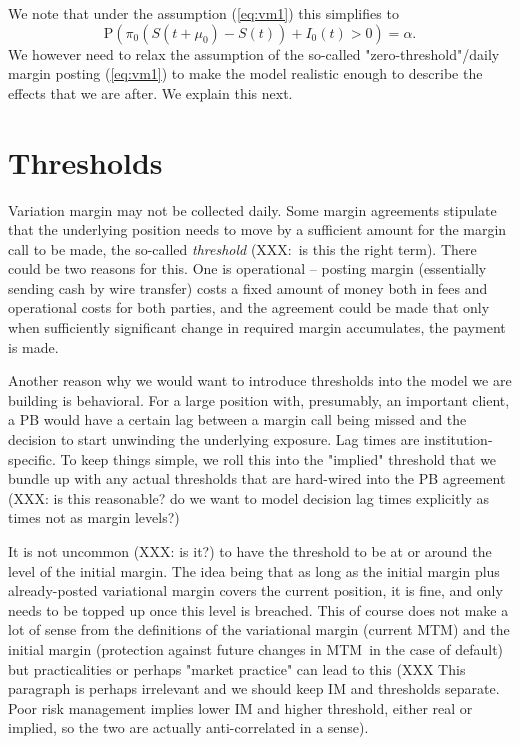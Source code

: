 \documentclass{article}
\begin{document}
We note that under the assumption (\ref{eq:vm1}) this simplifies to%
\[
\mathrm{P}\left( \pi _{0}\left( S(t+\mu _{0})-S(t)\right) +I_{0}(t)>0\right)
=\alpha .
\]%
We however need to relax the assumption of the so-called
"zero-threshold"/daily margin posting (\ref{eq:vm1}) to make the model
realistic enough to describe the effects that we are after. We explain this
next.

\section{Thresholds}

Variation margin may not be collected daily. Some margin agreements
stipulate that the underlying position needs to move by a sufficient amount
for the margin call to be made, the so-called \emph{threshold} (XXX:\ is
this the right term). There could be two reasons for this. One is
operational -- posting margin (essentially sending cash by wire transfer)
costs a fixed amount of money both in fees and operational costs for both
parties, and the agreement could be made that only when sufficiently
significant change in required margin accumulates, the payment is made. 

Another reason why we would want to introduce thresholds into the model we
are building is behavioral. For a large position with, presumably, an
important client, a PB would have a certain lag between a margin call being
missed and the decision to start unwinding the underlying exposure. Lag
times are institution-specific. To keep things simple, we roll this into the
"implied" threshold that we bundle up with any actual thresholds that are
hard-wired into the PB agreement (XXX: is this reasonable? do we want to
model decision lag times explicitly as times not as margin levels?)

It is not uncommon (XXX: is it?) to have the threshold to be at or around
the level of the initial margin. The idea being that as long as the initial
margin plus already-posted variational margin covers the current position,
it is fine, and only needs to be topped up once this level is breached. This
of course does not make a lot of sense from the definitions of the
variational margin (current MTM) and the initial margin (protection against
future changes in MTM\ in the case of default) but practicalities or perhaps
"market practice" can lead to this (XXX This paragraph is perhaps irrelevant
and we should keep IM and thresholds separate. Poor risk management implies
lower IM and higher threshold, either real or implied, so the two are
actually anti-correlated in a sense). 
\end{document}
